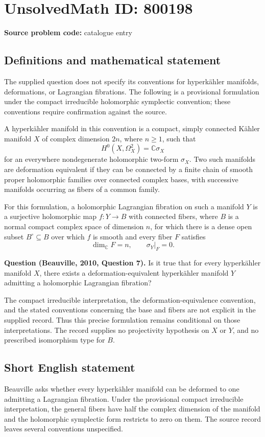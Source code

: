 \documentclass[11pt]{article}
\newcommand{\C}{\mathbb{C}}
\begin{document}
\section*{UnsolvedMath ID: 800198}
\textbf{Source problem code:} catalogue entry
\subsection{Definitions and mathematical statement}
The supplied question does not specify its conventions for hyperk\"ahler manifolds, deformations, or Lagrangian fibrations. The following is a provisional formulation under the compact irreducible holomorphic symplectic convention; these conventions require confirmation against the source.

A hyperk\"ahler manifold in this convention is a compact, simply connected K\"ahler manifold \(X\) of complex dimension \(2n\), where \(n\geq 1\), such that
\[
H^0(X,\Omega_X^2)=\C\sigma_X
\]
for an everywhere nondegenerate holomorphic two-form \(\sigma_X\). Two such manifolds are deformation equivalent if they can be connected by a finite chain of smooth proper holomorphic families over connected complex bases, with successive manifolds occurring as fibers of a common family.

For this formulation, a holomorphic Lagrangian fibration on such a manifold \(Y\) is a surjective holomorphic map \(f:Y\to B\) with connected fibers, where \(B\) is a normal compact complex space of dimension \(n\), for which there is a dense open subset \(B^\circ\subseteq B\) over which \(f\) is smooth and every fiber \(F\) satisfies
\[
\dim_{\C}F=n,\qquad \sigma_Y|_F=0.
\]

\textbf{Question (Beauville, 2010, Question 7).} Is it true that for every hyperk\"ahler manifold \(X\), there exists a deformation-equivalent hyperk\"ahler manifold \(Y\) admitting a holomorphic Lagrangian fibration?

The compact irreducible interpretation, the deformation-equivalence convention, and the stated conventions concerning the base and fibers are not explicit in the supplied record. Thus this precise formulation remains conditional on those interpretations. The record supplies no projectivity hypothesis on \(X\) or \(Y\), and no prescribed isomorphism type for \(B\).
\subsection{Short English statement}
Beauville asks whether every hyperk\"ahler manifold can be deformed to one admitting a Lagrangian fibration. Under the provisional compact irreducible interpretation, the general fibers have half the complex dimension of the manifold and the holomorphic symplectic form restricts to zero on them. The source record leaves several conventions unspecified.
\end{document}
